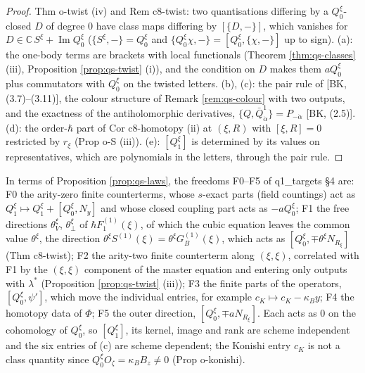 \begin{proof}
Thm o-twist (iv) and Rem c8-twist: two quantisations differing by a $Q^\xi_0$-closed $D$ of degree $0$ have class maps differing by $[\{D,-\}]$, which vanishes for $D\in\mathbb C\,S^\xi+\operatorname{Im}Q^\xi_0$ ($\{S^\xi,-\}=Q^\xi_0$ and $\{Q^\xi_0\chi,-\}=[Q^\xi_0,\{\chi,-\}]$ up to sign). (a): the one-body terms are brackets with local functionals (Theorem \ref{thm:qs-classes} (iii), Proposition \ref{prop:qs-twist} (i)), and the condition on $D$ makes them $aQ^\xi_0$ plus commutators with $Q^\xi_0$ on the twisted letters. (b), (c): the pair rule of [BK, (3.7)--(3.11)], the colour structure of Remark \ref{rem:qs-colour} with two outputs, and the exactness of the antiholomorphic derivatives, $\{Q,\bar Q^1_{\dot\alpha}\}=P_{-\dot\alpha}$ [BK, (2.5)]. (d): the order-$\hbar$ part of Cor c8-homotopy (ii) at $(\xi,R)$ with $[\xi,R]=0$ restricted by $r_\xi$ (Prop o-S (iii)). (e): $[Q^\xi_1]$ is determined by its values on representatives, which are polynomials in the letters, through the pair rule.
\end{proof}

\begin{remark}
\label{rem:qs-twistfreedom}
In terms of Proposition \ref{prop:qs-laws}, the freedoms F0--F5 of q1\_targets §4 are: F0 the arity-zero finite counterterms, whose $s$-exact parts (field countings) act as $Q^\xi_1\mapsto Q^\xi_1+[Q^\xi_0,N_y]$ and whose closed coupling part acts as $-aQ^\xi_0$; F1 the free directions $\theta^\xi_V$, $\theta^\xi_\perp$ of $\hbar F_1^{(1)}(\xi)$, of which the cubic equation leaves the common value $\theta^\xi$, the direction $\theta^\xi S^{(1)}(\xi)=\theta^\xi G_B^{(1)}(\xi)$, which acts as $[Q^\xi_0,\mp\theta^\xi N_{R_\xi}]$ (Thm c8-twist); F2 the arity-two finite counterterm along $(\xi,\xi)$, correlated with F1 by the $(\xi,\xi)$ component of the master equation and entering only outputs with $\lambda^*$ (Proposition \ref{prop:qs-twist} (iii)); F3 the finite parts of the operators, $[Q^\xi_0,\psi']$, which move the individual entries, for example $c_K\mapsto c_K-\kappa_By$; F4 the homotopy data of $\Phi$; F5 the outer direction, $[Q^\xi_0,\mp aN_{R_\xi}]$. Each acts as $0$ on the cohomology of $Q^\xi_0$, so $[Q^\xi_1]$, its kernel, image and rank are scheme independent and the six entries of (c) are scheme dependent; the Konishi entry $c_K$ is not a class quantity since $Q^\xi_0O_\zeta=\kappa_BB_z\neq0$ (Prop o-konishi).
\end{remark}


